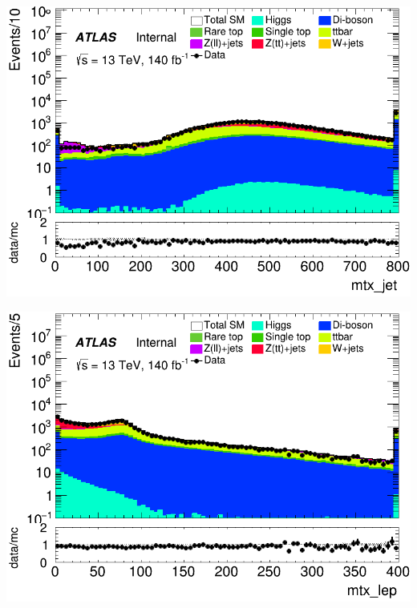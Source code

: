 \documentclass[usenames,dvipsnames]{beamer}
\begin{document}
\begin{frame}
    \begin{minipage}{0.32\textwidth}
        \centering
        \includegraphics[width=\textwidth]{graphics/L_met/L_met_mtx_jet.png}
    \end{minipage}
        \hfill
    \begin{minipage}{0.32\textwidth}
        \centering
        \includegraphics[width=\textwidth]{graphics/L_met/L_met_mtx_lep.png}
    \end{minipage}
    \hfill
    \begin{minipage}{0.32\textwidth}
        \centering

\end{minipage}
\end{frame}
\end{document}
